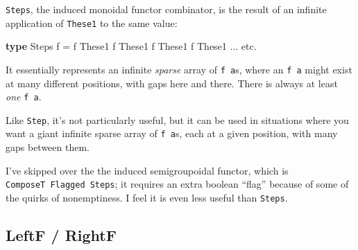 \documentclass[]{article}
\newenvironment{Shaded}{}{}
\newcommand{\DataTypeTok}[1]{\textcolor[rgb]{0.56,0.13,0.00}{#1}}
\newcommand{\KeywordTok}[1]{\textcolor[rgb]{0.00,0.44,0.13}{\textbf{#1}}}
\newcommand{\NormalTok}[1]{#1}
\newcommand{\OperatorTok}[1]{\textcolor[rgb]{0.40,0.40,0.40}{#1}}
\newcommand{\OtherTok}[1]{\textcolor[rgb]{0.00,0.44,0.13}{#1}}
\begin{document}
\begin{itemize}
  \texttt{Steps}, the induced monoidal functor combinator, is the result of an
  infinite application of \texttt{These1} to the same value:

\begin{Shaded}
\begin{Highlighting}[]
\KeywordTok{type} \DataTypeTok{Steps}\NormalTok{ f }\OtherTok{=}\NormalTok{ f }\OtherTok{\textasciigrave{}These1\textasciigrave{}}\NormalTok{ f }\OtherTok{\textasciigrave{}These1\textasciigrave{}}\NormalTok{ f }\OtherTok{\textasciigrave{}These1\textasciigrave{}}\NormalTok{ f }\OtherTok{\textasciigrave{}These1\textasciigrave{}} \OperatorTok{...}\NormalTok{ etc}\OperatorTok{.}
\end{Highlighting}
\end{Shaded}

  It essentially represents an infinite \emph{sparse} array of \texttt{f\ a}s,
  where an \texttt{f\ a} might exist at many different positions, with gaps here
  and there. There is always at least \emph{one} \texttt{f\ a}.

  Like \texttt{Step}, it's not particularly useful, but it can be used in
  situations where you want a giant infinite sparse array of \texttt{f\ a}s,
  each at a given position, with many gaps between them.

  I've skipped over the the induced semigroupoidal functor, which is
  \texttt{ComposeT\ Flagged\ Steps}; it requires an extra boolean ``flag''
  because of some of the quirks of nonemptiness. I feel it is even less useful
  than \texttt{Steps}.
\end{itemize}

\hypertarget{leftf-rightf}{%
\subsection{LeftF / RightF}\label{leftf-rightf}}
\end{document}
